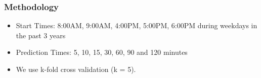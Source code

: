 \documentclass[t]{beamer}
\begin{document}
\begin{frame}\frametitle{Methodology}
\begin{itemize}
\item Start Times: 8:00AM, 9:00AM, 4:00PM, 5:00PM, 6:00PM during weekdays in the past 3 years\\
\item<3-> Prediction Times: 5, 10, 15, 30, 60, 90 and 120 minutes
\item<4-> We use k-fold cross validation (k = 5).
\end{itemize}

\end{frame}

\end{document}
